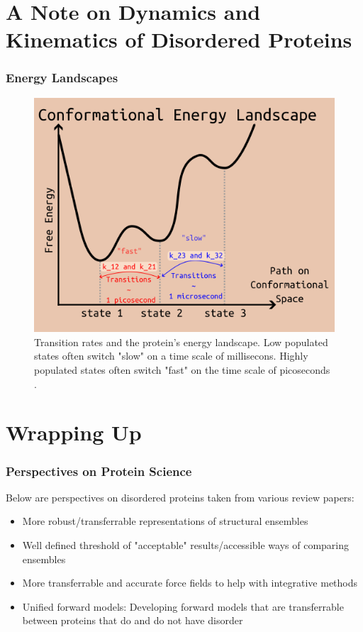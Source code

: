 \documentclass{beamer}
\begin{document}
\section{A Note on Dynamics and Kinematics of Disordered Proteins}
\begin{frame}
\frametitle{Energy Landscapes}
\begin{figure}[h]
    \centering
    \includegraphics[scale=0.55]{energy-landscape.png}
    \caption{Transition rates and the protein's energy landscape.
        Low populated states often switch "slow" on a time scale of millisecons.
    Highly populated states often switch "fast" on the time scale of picoseconds \cite{bonomiDeterminationProteinStructural2019}. }
    \label{fig:min-bacteria}
\end{figure}
\end{frame}

\section{Wrapping Up}
\begin{frame}
    \frametitle{Perspectives on Protein Science}
    Below are perspectives on disordered proteins taken from various review papers:
    \begin{itemize}
        \item More robust/transferrable representations of structural ensembles \cite{bonomiDeterminationProteinStructural2019}
        \item Well defined threshold of "acceptable" results/accessible ways of comparing ensembles \cite{bonomiDeterminationProteinStructural2019}
        \item More transferrable and accurate force fields to help with integrative methods \cite{thomasenConformationalEnsemblesIntrinsically2022}
        \item Unified forward models: Developing forward models that are transferrable between proteins that do and do not have disorder \cite{thomasenConformationalEnsemblesIntrinsically2022}
    \end{itemize}
\end{frame}
\end{document}
